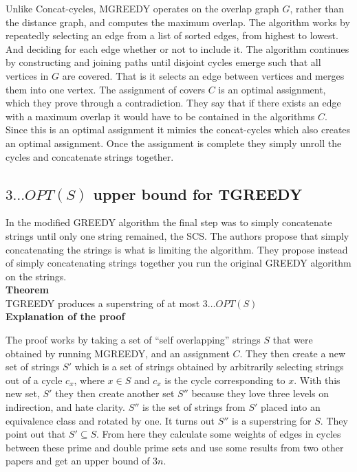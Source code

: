 \documentclass[letterpaper,11pt,titlepage]{article}
\begin{document}
Unlike Concat-cycles, MGREEDY operates on the overlap graph $G$, rather than the distance graph, and computes the maximum overlap. The algorithm works by repeatedly selecting an edge from a list of sorted edges, from highest to lowest. And deciding for each edge whether or not to include it. The algorithm continues by constructing and joining paths until disjoint cycles emerge such that all vertices in $G$ are covered. That is it selects an edge between vertices and merges them into one vertex. The assignment of covers $C$ is an optimal assignment, which they prove through a contradiction. They say that if there exists an edge with a maximum overlap it would have to be contained in the algorithms $C$. Since this is an optimal assignment it mimics the concat-cycles which also creates an optimal assignment. Once the assignment is complete they simply unroll the cycles and concatenate strings together. 

\subsection*{$3 \ldots OPT(S)$ upper bound for TGREEDY}

In the modified GREEDY algorithm the final step was to simply concatenate strings until only one string remained, the SCS. The authors propose that simply concatenating the strings is what is limiting the algorithm. They propose instead of simply concatenating strings together you run the original GREEDY algorithm on the strings. \\

\textbf{Theorem}\\
TGREEDY produces a superstring of at most $3 \ldots OPT(S)$\\

\textbf{Explanation of the proof}

The proof works by taking a set of ``self overlapping'' strings $S$ that were obtained by running MGREEDY, and an assignment $C$. They then create a new set of strings $S'$ which is a set of strings obtained by arbitrarily selecting strings out of a cycle $c_x$, where $x \in S$ and $c_x$ is the cycle corresponding to $x$. With this new set, $S'$ they then create another set $S''$ because they love three levels on indirection, and hate clarity. $S''$ is the set of strings from $S'$ placed into an equivalence class and rotated by one. It turns out $S''$ is a superstring for $S$. They point out that $S' \subseteq S$. From here they calculate some weights of edges in cycles between these prime and double prime sets and use some results from two other papers and get an upper bound of $3n$.\\
\end{document}
